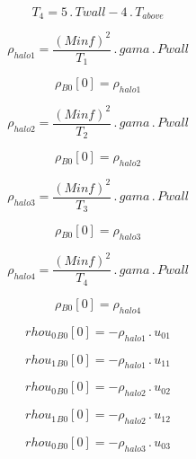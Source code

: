 \documentclass{article}
\begin{document}
\begin{dmath}T_{4} = 5 \,.\, Twall - 4 \,.\, T_{above}\end{dmath}

\begin{dmath}\rho_{halo 1} = \frac{\left(Minf \right)^{2}}{T_{1}} \,.\, gama \,.\, Pwall\end{dmath}

\begin{dmath}{\rho{_{B0}}}[{0}] = \rho_{halo 1}\end{dmath}

\begin{dmath}\rho_{halo 2} = \frac{\left(Minf \right)^{2}}{T_{2}} \,.\, gama \,.\, Pwall\end{dmath}

\begin{dmath}{\rho{_{B0}}}[{0}] = \rho_{halo 2}\end{dmath}

\begin{dmath}\rho_{halo 3} = \frac{\left(Minf \right)^{2}}{T_{3}} \,.\, gama \,.\, Pwall\end{dmath}

\begin{dmath}{\rho{_{B0}}}[{0}] = \rho_{halo 3}\end{dmath}

\begin{dmath}\rho_{halo 4} = \frac{\left(Minf \right)^{2}}{T_{4}} \,.\, gama \,.\, Pwall\end{dmath}

\begin{dmath}{\rho{_{B0}}}[{0}] = \rho_{halo 4}\end{dmath}

\begin{dmath}{rhou_{0}{_{B0}}}[{0}] = - \rho_{halo 1} \,.\, u_{01}\end{dmath}

\begin{dmath}{rhou_{1}{_{B0}}}[{0}] = - \rho_{halo 1} \,.\, u_{11}\end{dmath}

\begin{dmath}{rhou_{0}{_{B0}}}[{0}] = - \rho_{halo 2} \,.\, u_{02}\end{dmath}

\begin{dmath}{rhou_{1}{_{B0}}}[{0}] = - \rho_{halo 2} \,.\, u_{12}\end{dmath}

\begin{dmath}{rhou_{0}{_{B0}}}[{0}] = - \rho_{halo 3} \,.\, u_{03}\end{dmath}
\end{document}
